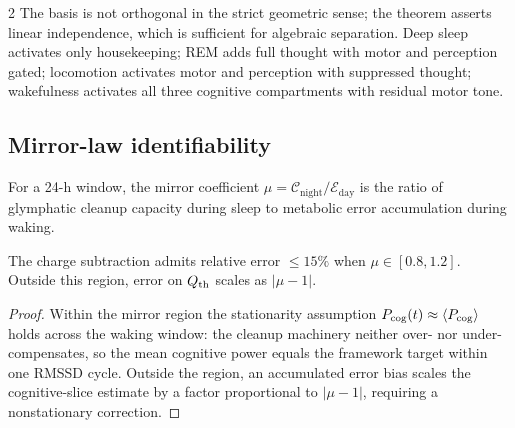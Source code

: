 \begin{multicols}{2}
The basis is not orthogonal in the strict geometric sense; the theorem
asserts linear independence, which is sufficient for algebraic separation.
Deep sleep activates only housekeeping; REM adds full thought with motor and
perception gated; locomotion activates motor and perception with suppressed
thought; wakefulness activates all three cognitive compartments with residual
motor tone.

\subsection{Mirror-law identifiability}

\begin{definition}
\label{def:ch07-mirror}
For a 24-h window, the mirror coefficient $\mu = \mathcal{C}_{\mathrm{night}}/
\mathcal{E}_{\mathrm{day}}$ is the ratio of glymphatic cleanup capacity
during sleep \citep{xie2013,hablitz2020} to metabolic error accumulation
during waking.
\end{definition}

\begin{theorem}
\label{thm:ch07-mirror}
The charge subtraction admits relative error $\le 15\%$ when
$\mu \in [0.8, 1.2]$.  Outside this region, error on $Q_{\mathrm{th}}$ scales as
$|\mu - 1|$.
\end{theorem}

\begin{proof}
Within the mirror region the stationarity assumption $P_{\mathrm{cog}}(t) \approx
\langle P_{\mathrm{cog}}\rangle$ holds across the waking window: the cleanup machinery
neither over- nor under-compensates, so the mean cognitive power equals the
framework target within one RMSSD cycle.  Outside the region, an accumulated
error bias scales the cognitive-slice estimate by a factor proportional to
$|\mu-1|$, requiring a nonstationary correction.
\end{proof}

\end{multicols}

